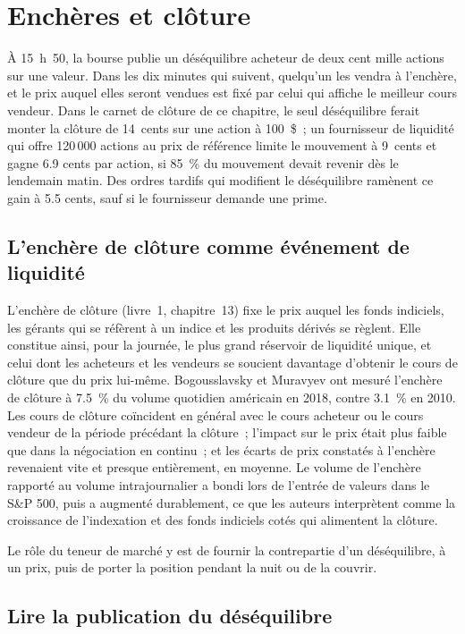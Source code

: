 \chapter{Enchères et clôture}\label{ch:hf:auctions-and-the-close}

À 15~h~50, la bourse publie un déséquilibre acheteur de deux cent mille actions sur une valeur. Dans les dix minutes qui suivent, quelqu'un les vendra
à l'enchère, et le prix auquel elles seront vendues est fixé par celui qui affiche le meilleur cours vendeur.
Dans le carnet de clôture de ce chapitre, le seul déséquilibre ferait monter la clôture de 14~cents sur une action à 100~\$~; un fournisseur de liquidité qui offre 120\,000 actions au prix de référence limite le mouvement à 9~cents et gagne 6.9
cents par action, si 85~\% du mouvement devait revenir dès le lendemain matin. Des ordres tardifs qui modifient le déséquilibre ramènent ce gain à 5.5 cents, sauf si le
fournisseur demande une prime.

\section{L'enchère de clôture comme événement de liquidité}

L'enchère de clôture (livre~1, chapitre~13) fixe le prix auquel les fonds indiciels, les gérants qui se réfèrent à un indice et les produits dérivés se règlent. Elle constitue ainsi, pour la
journée, le plus grand réservoir de liquidité unique, et celui dont les acheteurs et les vendeurs se soucient davantage d'obtenir le cours de clôture que du prix lui-même.
Bogousslavsky et Muravyev ont mesuré l'enchère de clôture à 7.5~\% du volume quotidien américain en 2018, contre 3.1~\% en 2010. Les cours de clôture coïncident en général avec le
cours acheteur ou le cours vendeur de la période précédant la clôture~; l'impact sur le prix était plus faible que dans la négociation en continu~; et les écarts de prix constatés à l'enchère revenaient vite et presque entièrement, en
moyenne. Le volume de l'enchère rapporté au volume intrajournalier a bondi lors de l'entrée de valeurs dans le S\&P 500, puis a augmenté durablement, ce que les auteurs interprètent comme la croissance de
l'indexation et des fonds indiciels cotés qui alimentent la clôture.

Le rôle du teneur de marché y est de fournir la contrepartie d'un déséquilibre, à un prix, puis de porter la position pendant la nuit ou de la couvrir.

\section{Lire la publication du déséquilibre}

